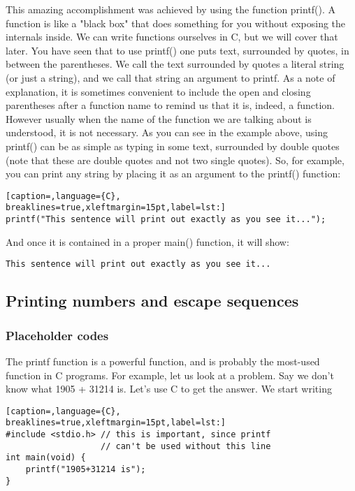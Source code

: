 This amazing accomplishment was achieved by using the function printf(). A
function is like a "black box" that does something for you without exposing the
internals inside. We can write functions ourselves in C, but we will cover that
later.  You have seen that to use printf() one puts text, surrounded by quotes,
in between the parentheses. We call the text surrounded by quotes a literal
string (or just a string), and we call that string an argument to printf.  As a
note of explanation, it is sometimes convenient to include the open and closing
parentheses after a function name to remind us that it is, indeed, a function.
However usually when the name of the function we are talking about is
understood, it is not necessary.  As you can see in the example above, using
printf() can be as simple as typing in some text, surrounded by double quotes
(note that these are double quotes and not two single quotes). So, for example,
you can print any string by placing it as an argument to the printf() function:
\lstset{basicstyle=\scriptsize, numbers=left, captionpos=b, tabsize=4}
\begin{lstlisting}[caption=,language={C},
breaklines=true,xleftmargin=15pt,label=lst:]
printf("This sentence will print out exactly as you see it...");
\end{lstlisting}

And once it is contained in a proper main() function, it will show:
\scriptsize
\begin{verbatim}
This sentence will print out exactly as you see it...
\end{verbatim}
\normalsize

\subsection{Printing numbers and escape sequences}
\subsubsection{Placeholder codes}
The printf function is a powerful function, and is probably the most-used
function in C programs.  For example, let us look at a problem. Say we don't
know what 1905 + 31214 is. Let's use C to get the answer.  We start writing
\lstset{basicstyle=\scriptsize, numbers=left, captionpos=b, tabsize=4}
\begin{lstlisting}[caption=,language={C},
breaklines=true,xleftmargin=15pt,label=lst:]
#include <stdio.h> // this is important, since printf 
                   // can't be used without this line
int main(void) {
	printf("1905+31214 is");
}
\end{lstlisting}

